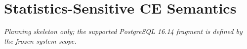 \section{Statistics-Sensitive CE Semantics}
\textit{Planning skeleton only; the supported PostgreSQL 16.14 fragment is
defined by the frozen system scope.}

